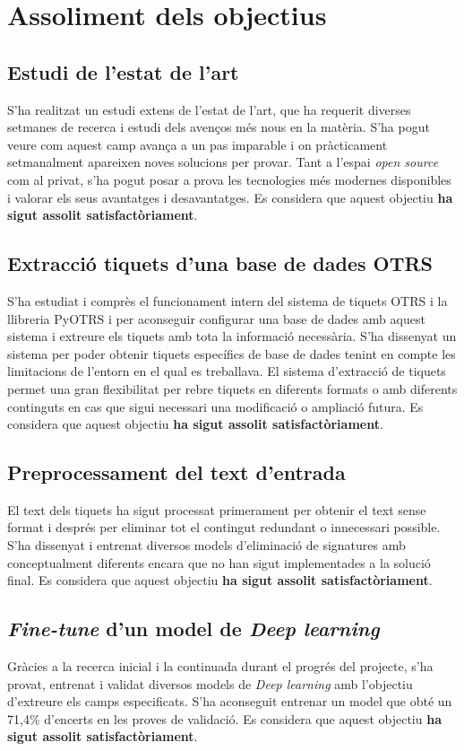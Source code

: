 \section{Assoliment dels objectius}

\subsection{Estudi de l'estat de l'art}
S'ha realitzat un estudi extens de l'estat de l'art, que ha requerit diverses setmanes de recerca i estudi dels avenços més nous en la matèria. S'ha pogut veure com aquest camp avança a un pas imparable i on pràcticament setmanalment apareixen noves solucions per provar. Tant a l'espai \textit{open source} com al privat, s'ha pogut posar a prova les tecnologies més modernes disponibles i valorar els seus avantatges i desavantatges. Es considera que aquest objectiu \textbf{ha sigut assolit satisfactòriament}.

\subsection{Extracció tiquets d'una base de dades OTRS}
S'ha estudiat i comprès el funcionament intern del sistema de tiquets OTRS i la llibreria PyOTRS i per aconseguir configurar una base de dades amb aquest sistema i extreure els tiquets amb tota la informació necessària. S'ha dissenyat un sistema per poder obtenir tiquets específics de base de dades tenint en compte les limitacions de l'entorn en el qual es treballava. El sistema d'extracció de tiquets permet una gran flexibilitat per rebre tiquets en diferents formats o amb diferents continguts en cas que sigui necessari una modificació o ampliació futura. Es considera que aquest objectiu \textbf{ha sigut assolit satisfactòriament}.

\subsection{Preprocessament del text d'entrada}
El text dels tiquets ha sigut processat primerament per obtenir el text sense format i després per eliminar tot el contingut redundant o innecessari possible. S'ha dissenyat i entrenat diversos models d'eliminació de signatures amb conceptualment diferents encara que no han sigut implementades a la solució final. Es considera que aquest objectiu \textbf{ha sigut assolit satisfactòriament}.

\subsection{\textit{Fine-tune} d'un model de \textit{Deep learning}}
Gràcies a la recerca inicial i la continuada durant el progrés del projecte, s'ha provat, entrenat i validat diversos models de \textit{Deep learning} amb l'objectiu d'extreure els camps especificats. S'ha aconseguit entrenar un model que obté un 71,4\% d'encerts en les proves de validació. Es considera que aquest objectiu \textbf{ha sigut assolit satisfactòriament}.

